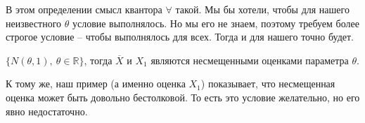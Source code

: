 \begin{note}
В этом определении смысл квантора $\forall$ такой. Мы бы хотели, чтобы для нашего неизвестного $\theta$ условие выполнялось. Но мы его не знаем, поэтому требуем более строгое условие -- чтобы выполнялось для всех. Тогда и для нашего точно будет.
\end{note}

\begin{example}
$\displaystyle \{N( \theta ,1),\ \theta \in \mathbb{R}\}$, тогда $\displaystyle \overline{X}$ и $\displaystyle X_{1}$ являются несмещенными оценками параметра $\displaystyle \theta $.

К тому же, наш пример (а именно оценка $X_{1}$) показывает, что несмещенная оценка может быть довольно бестолковой. То есть это условие желательно, но его явно недостаточно.
\end{example}


